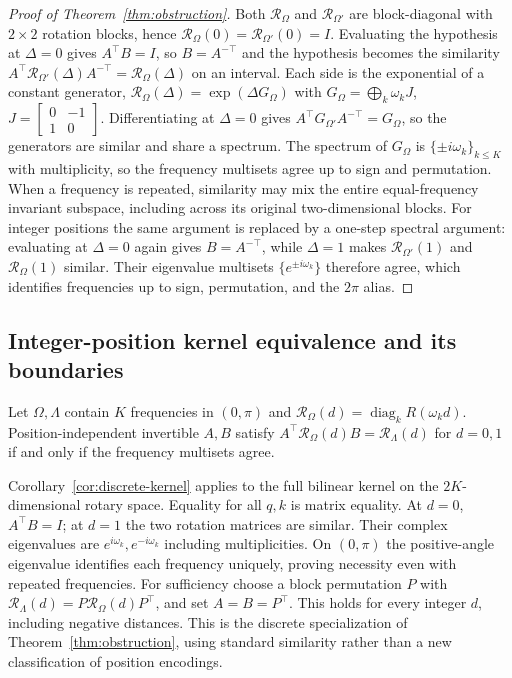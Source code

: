 \begin{proof}[Proof of Theorem~\ref{thm:obstruction}]
Both $\mathcal R_\Omega$ and $\mathcal R_{\Omega'}$ are block-diagonal with $2\times2$ rotation
blocks, hence $\mathcal R_\Omega(0)=\mathcal R_{\Omega'}(0)=I$. Evaluating the hypothesis at
$\Delta{=}0$ gives $A^\top B=I$, so $B=A^{-\top}$ and the hypothesis becomes the
similarity $A^\top \mathcal R_{\Omega'}(\Delta)A^{-\top}=\mathcal R_\Omega(\Delta)$ on an interval.
Each side is the exponential of a constant generator, $\mathcal R_\Omega(\Delta)=\exp(\Delta G_\Omega)$
with $G_\Omega=\bigoplus_k \omega_k J$, $J=\left[\begin{smallmatrix}0&-1\\1&0\end{smallmatrix}\right]$.
Differentiating at $\Delta{=}0$ gives $A^\top G_{\Omega'}A^{-\top}=G_\Omega$, so
the generators are similar and share a spectrum. The spectrum of $G_\Omega$ is
$\{\pm i\omega_k\}_{k\le K}$ with multiplicity, so the frequency multisets agree
up to sign and permutation. When a frequency is repeated, similarity may mix
the entire equal-frequency invariant subspace, including across its original
two-dimensional blocks. For integer positions the same argument
is replaced by a one-step spectral argument: evaluating at $\Delta=0$ again
gives $B=A^{-\top}$, while $\Delta=1$ makes $\mathcal R_{\Omega'}(1)$ and
$\mathcal R_\Omega(1)$ similar. Their eigenvalue multisets
$\{e^{\pm i\omega_k}\}$ therefore agree, which identifies frequencies up to
sign, permutation, and the $2\pi$ alias.
\end{proof}


\subsection{Integer-position kernel equivalence and its boundaries}
\label{sec:discrete-kernel-proof}
\begin{corollary}\label{cor:discrete-kernel}
Let $\Omega,\Lambda$ contain $K$ frequencies in $(0,\pi)$ and
$\mathcal R_\Omega(d)=\operatorname{diag}_k R(\omega_kd)$.
Position-independent invertible $A,B$ satisfy
$A^\top\mathcal R_\Omega(d)B=\mathcal R_\Lambda(d)$ for $d=0,1$
if and only if the frequency multisets agree.
\end{corollary}

Corollary~\ref{cor:discrete-kernel} applies to the full bilinear kernel on the
$2K$-dimensional rotary space. Equality for all $q,k$ is matrix equality.
At $d=0$, $A^\top B=I$; at $d=1$ the two rotation matrices are similar.
Their complex eigenvalues are $e^{i\omega_k},e^{-i\omega_k}$ including
multiplicities. On $(0,\pi)$ the positive-angle eigenvalue identifies each
frequency uniquely, proving necessity even with repeated frequencies.
For sufficiency choose a block permutation $P$ with
$\mathcal R_\Lambda(d)=P\mathcal R_\Omega(d)P^\top$, and set
$A=B=P^\top$. This holds for every integer $d$, including negative distances.
This is the discrete specialization of Theorem~\ref{thm:obstruction}, using
standard similarity rather than a new classification of position encodings.

